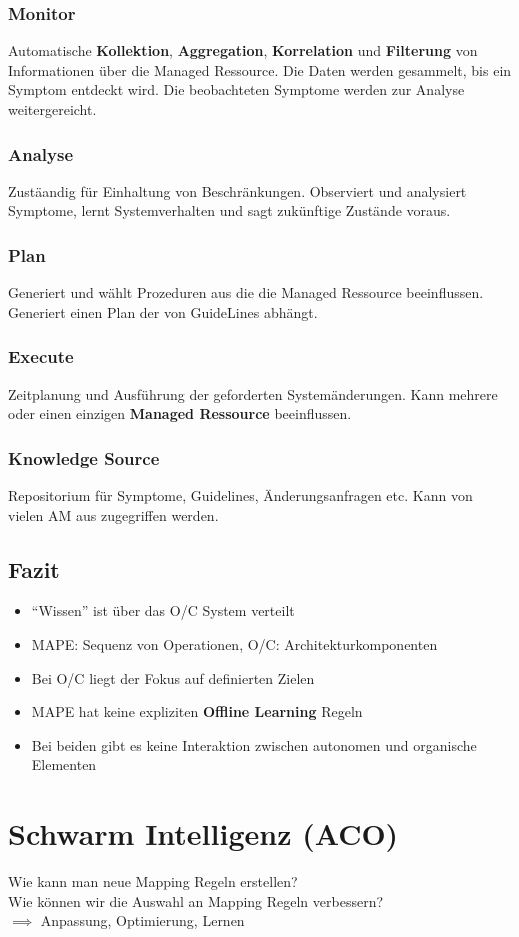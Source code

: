 \documentclass[a4paper]{article}
\begin{document}
\subsubsection{Monitor}
Automatische \textbf{Kollektion}, \textbf{Aggregation}, \textbf{Korrelation} und \textbf{Filterung} von Informationen über die Managed Ressource. Die Daten werden gesammelt, bis ein Symptom entdeckt wird. Die beobachteten Symptome werden zur Analyse weitergereicht.
\subsubsection{Analyse}
Zustäandig für Einhaltung von Beschränkungen. Observiert und analysiert Symptome, lernt Systemverhalten und sagt zukünftige Zustände voraus.
\subsubsection{Plan}
Generiert und wählt Prozeduren aus die die Managed Ressource beeinflussen. Generiert einen Plan der von GuideLines abhängt.
\subsubsection{Execute}
Zeitplanung und Ausführung der geforderten Systemänderungen. Kann mehrere oder einen einzigen \textbf{Managed Ressource} beeinflussen.
\subsubsection{Knowledge Source}
Repositorium für Symptome, Guidelines, Änderungsanfragen etc. Kann von vielen AM aus zugegriffen werden.
\subsection{Fazit}
\begin{itemize}
	\item ``Wissen'' ist über das O/C System verteilt
	\item MAPE: Sequenz von Operationen, O/C: Architekturkomponenten
	\item Bei O/C liegt der Fokus auf definierten Zielen
	\item MAPE hat keine expliziten \textbf{Offline Learning} Regeln
	\item Bei beiden gibt es keine Interaktion zwischen autonomen und organische Elementen
\end{itemize}	
\newpage

\section{Schwarm Intelligenz (ACO)}
	Wie kann man neue Mapping Regeln erstellen?\\
	Wie können wir die Auswahl an Mapping Regeln verbessern?\\
	$\implies$ Anpassung, Optimierung, Lernen
	
\end{document}
